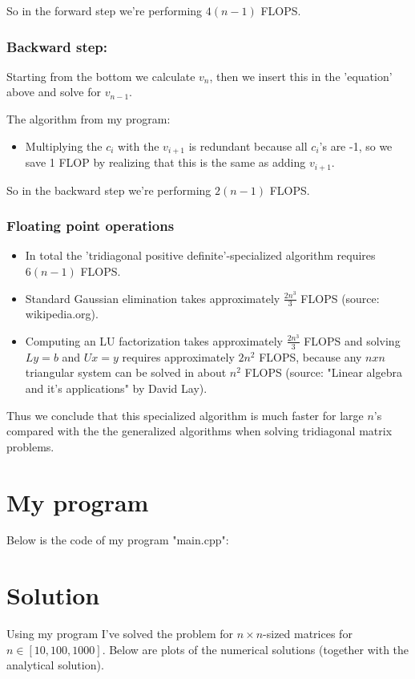 \documentclass[norsk,a4paper,12pt]{article}
\begin{document}
So in the forward step we're performing $4(n-1)$ FLOPS.


\subsubsection*{Backward step:}
Starting from the bottom we calculate $v_n$, then we insert this in the 'equation' above and solve for $v_{n-1}$.

The algorithm from my program:



\begin{itemize}
\item Multiplying the $c_i$ with  the $v_{i+1}$ is redundant because all $c_i$'s are -1, so we save 1 FLOP by realizing that this is the same as adding $v_{i+1}$.
\end{itemize}
So in the backward step we're performing $2(n-1)$ FLOPS.


\subsubsection*{Floating point operations}
\begin{itemize}
\item In total the 'tridiagonal positive definite'-specialized algorithm requires $6(n-1)$ FLOPS.
\item Standard Gaussian elimination takes approximately $\frac{2n^3}{3}$ FLOPS (source: wikipedia.org).
\item Computing an LU factorization takes approximately $\frac{2n^3}{3}$ FLOPS and solving $Ly = b$ and $Ux = y$ requires approximately $2n^2$ FLOPS, because any $n x n$ triangular system can be solved in about $n^2$ FLOPS (source: "Linear algebra and it's applications" by David Lay).
\end{itemize}

Thus we conclude that this specialized algorithm is much faster for large $n$'s compared with the the generalized algorithms when solving tridiagonal matrix problems.


\section{My program}
Below is the code of my program "main.cpp": 

\small

\normalsize


\section{Solution}
Using my program I've solved the problem for $n \times n$-sized matrices for $n \in [10,100,1000]$. Below are plots of the numerical solutions (together with the analytical solution).
\end{document}
